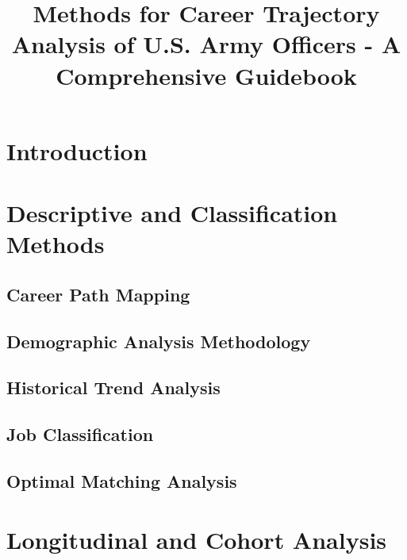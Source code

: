 \documentclass[12pt,a4paper]{article}
\title{Methods for Career Trajectory Analysis of U.S. Army Officers - A Comprehensive Guidebook}
\author{}
\date{}
\begin{document}
\maketitle

\tableofcontents

\newpage
\section{Introduction}


\newpage
\section{Descriptive and Classification Methods}


\subsection{Career Path Mapping}


\subsection{Demographic Analysis Methodology}


\subsection{Historical Trend Analysis}


\subsection{Job Classification}


\subsection{Optimal Matching Analysis}


\newpage
\section{Longitudinal and Cohort Analysis}

\end{document}
